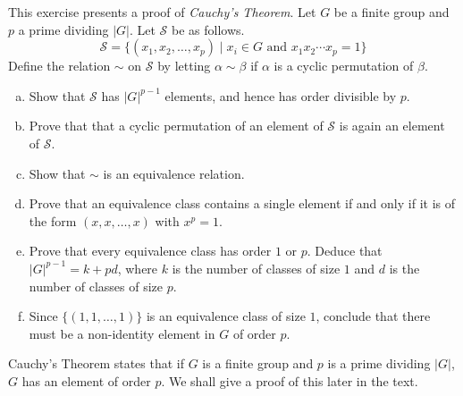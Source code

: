 \begin{exercise}
    This exercise presents a proof of \textit{Cauchy's Theorem}. Let $G$ be a finite group and $p$ a prime dividing $|G|$. Let $\mathcal{S}$ be as follows.
    $$\mathcal{S}=\{(x_1,x_2,\ldots,x_p)\mid x_i\in G\text{ and } x_1x_2\cdots x_p=1\}$$
    Define the relation $\sim$ on $\mathcal{S}$ by letting $\alpha\sim\beta$ if $\alpha$ is a cyclic permutation of $\beta$.
    \begin{enumerate}[(a)]
        \item Show that $\mathcal{S}$ has $|G|^{p-1}$ elements, and hence has order divisible by $p$.
        \item Prove that that a cyclic permutation of an element of $\mathcal{S}$ is again an element of $\mathcal{S}$.
        \item Show that $\sim$ is an equivalence relation.
        \item Prove that an equivalence class contains a single element if and only if it is of the form $(x,x,\ldots,x)$ with $x^p=1$.
        \item Prove that every equivalence class has order $1$ or $p$. Deduce that $|G|^{p-1}=k+pd$, where $k$ is the number of classes of size $1$ and $d$ is the number of classes of size $p$.
        \item Since $\{(1,1,\ldots,1)\}$ is an equivalence class of size $1$, conclude that there must be a non-identity element in $G$ of order $p$.
    \end{enumerate}
    
    Cauchy's Theorem states that if $G$ is a finite group and $p$ is a prime dividing $|G|$, $G$ has an element of order $p$. We shall give a proof of this later in the text.
\end{exercise}

\clearpage